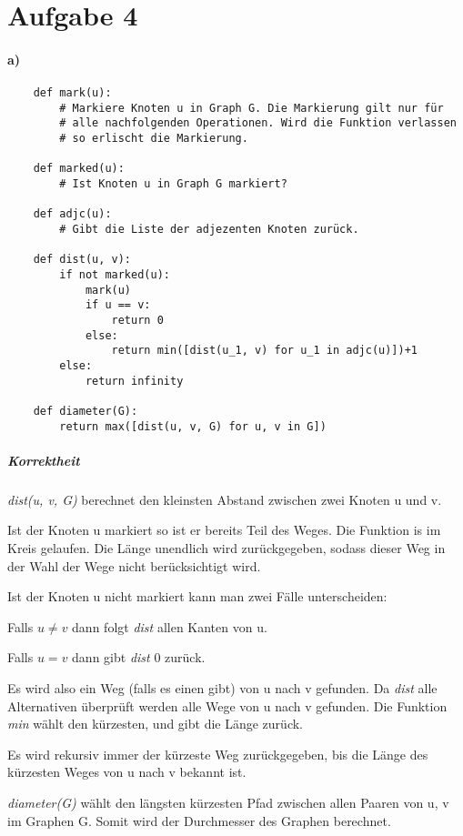 \documentclass[a4paper,10pt]{scrartcl}
\begin{document}
\section*{Aufgabe 4}

\paragraph{a)}

\begin{verbatim}
    def mark(u):
        # Markiere Knoten u in Graph G. Die Markierung gilt nur für
        # alle nachfolgenden Operationen. Wird die Funktion verlassen
        # so erlischt die Markierung.

    def marked(u):
        # Ist Knoten u in Graph G markiert?

    def adjc(u):
        # Gibt die Liste der adjezenten Knoten zurück.

    def dist(u, v):
        if not marked(u):
            mark(u)
            if u == v:
                return 0
            else:
                return min([dist(u_1, v) for u_1 in adjc(u)])+1
        else:
            return infinity

    def diameter(G):
        return max([dist(u, v, G) for u, v in G])
\end{verbatim}

\subparagraph{Korrektheit}

\emph{dist(u, v, G)} berechnet den kleinsten Abstand zwischen zwei Knoten u und v.


Ist der Knoten u markiert so ist er bereits Teil des Weges. Die Funktion is im Kreis gelaufen.
Die Länge unendlich wird zurückgegeben, sodass dieser Weg in der Wahl der Wege nicht berücksichtigt wird.

Ist der Knoten u nicht markiert kann man zwei Fälle unterscheiden:


Falls $u \neq v$ dann folgt \emph{dist} allen Kanten von u.


Falls $u = v$ dann gibt \emph{dist} 0 zurück.


Es wird also ein Weg (falls es einen gibt) von u nach v gefunden.
Da \emph{dist} alle Alternativen überprüft werden alle Wege von u nach v gefunden.
Die Funktion \emph{min} wählt den kürzesten, und gibt die Länge zurück.

Es wird rekursiv immer der kürzeste Weg zurückgegeben, bis die Länge des kürzesten Weges von u nach v bekannt ist.

\emph{diameter(G)} wählt den längsten kürzesten Pfad zwischen allen Paaren von u, v im Graphen G.
Somit wird der Durchmesser des Graphen berechnet.
\end{document}
